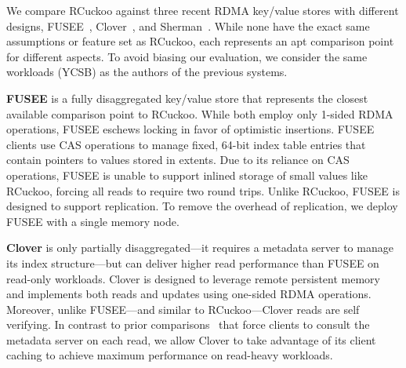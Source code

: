 
We compare RCuckoo against three recent RDMA key/value stores with
different designs, FUSEE~\cite{fusee}, Clover~\cite{clover}, and
Sherman~\cite{sherman}.  While none have the exact same assumptions or
feature set as RCuckoo, each represents an apt comparison point for
different aspects.  To avoid biasing our evaluation, we consider the same
workloads (YCSB) as the authors of the previous systems.
%

\textbf{FUSEE} is a fully disaggregated key/value store that
represents the closest available comparison point to RCuckoo.  While
both employ only 1-sided RDMA operations, FUSEE eschews locking in
favor of optimistic insertions.  FUSEE clients use CAS operations
to manage fixed, 64-bit index table entries that contain pointers to
values stored in extents.  Due to its reliance on CAS operations, FUSEE is unable to support inlined storage of small
values like RCuckoo, forcing all reads to require two round trips.
Unlike RCuckoo, FUSEE is designed to support replication.  To remove the overhead of replication, 
we deploy FUSEE with a single memory node.

\textbf{Clover} is only partially disaggregated---it requires a
metadata server to manage its index structure---but can deliver higher
read performance than FUSEE on read-only workloads.  Clover is
designed to leverage remote persistent memory and implements both
reads and updates using one-sided RDMA operations.  Moreover, unlike
FUSEE---and similar to RCuckoo---Clover reads are self verifying.
In contrast to prior comparisons~\cite{fusee} that force
clients to consult the metadata server on each read, we allow Clover
to take advantage of its client caching to achieve maximum performance
on read-heavy workloads.

